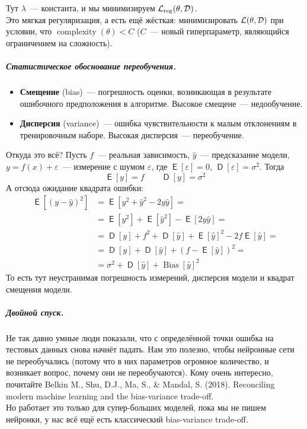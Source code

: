 \documentclass{article}
\DeclareMathOperator{\Expected}{\mathsf{E}}
\DeclareMathOperator{\Variance}{\mathsf{D}}
\DeclareMathOperator{\Bias}{Bias}
\begin{document}
    Тут $\lambda$~--- константа, и мы минимизируем ${\mathcal{L}}_{\mathrm{reg}}(\theta,{\mathcal{D}})$.\\
    Это мягкая регуляризация, а есть ещё жёсткая: минимизировать ${\mathcal{L}}(\theta,{\mathcal{D}})$ при условии, что $\operatorname{complexity}(\theta)<C$ ($C$~--- новый гиперпараметр, являющийся ограничением на сложность).
    \subparagraph{Статистическое обоснование переобучения.}
    \begin{itemize}
        \item \textbf{Смещение} (bias)~--- погрешность оценки, возникающая в результате ошибочного предположения в алгоритме. Высокое смещене~--- недообучение.
        \item \textbf{Дисперсия} (variance)~--- ошибка чувствительности к малым отклонениям в тренировочным наборе. Высокая дисперсия~--- переобучение.
    \end{itemize}
    Откуда это всё? Пусть $f$~--- реальная зависимость, $\widehat y$~--- предсказание модели, $y=f(x)+\varepsilon$~--- измерение с шумом $\varepsilon$, где $\Expected[\varepsilon]=0$, $\Variance[\varepsilon]=\sigma^2$. Тогда
    \[
    \Expected[y]=f\qquad\Variance[y]=\sigma^2
    \]
    А отсюда ожидание квадрата ошибки:
    \[\begin{split}
        \Expected\left[(y-\widehat y)^2\right]&=\Expected\left[y^2+{\widehat y}^2-2y\widehat y\right]=\\
        &=\Expected\left[y^2\right]+\Expected\left[{\widehat y}^2\right]-\Expected\left[2y\widehat y\right]=\\
        &=\Variance[y]+f^2+\Variance[\widehat y]+\Expected[\widehat y]^2-2f\Expected\left[\widehat y\right]=\\
        &=\Variance[y]+\Variance[\widehat y]+\left(f-\Expected[\widehat y]\right)^2=\\
        &=\sigma^2+\Variance[\widehat y]+\Bias[\widehat y]^2
    \end{split}\]
    То есть тут неустранимая погрешность измерений, дисперсия модели и квадрат смещения модели.
    \subparagraph{Двойной спуск.}
    Не так давно умные люди показали, что с определённой точки ошибка на тестовых данных снова начнёт падать. Нам это полезно, чтобы нейронные сети не переобучались (потому что в них параметров огромное количество, и возникает вопрос, почему они не переобучаются). Кому очень интересно, почитайте Belkin M., Shu, D.J., Ma, S., \& Mandal, S. (2018). Reconciling modern machine learning and the bias-variance trade-off.\\
    Но работает это только для супер-больших моделей, пока мы не пишем нейронки, у нас всё ещё есть классический bias-variance trade-off.
\end{document}

